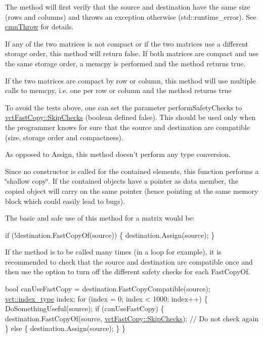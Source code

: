 \begin{DoxyItemize}
\item The method will first verify that the source and destination have the same size (rows and columns) and throws an exception otherwise ({\ttfamily std\-::runtime\-\_\-error}). See \hyperlink{cmn_throw_8h_a6fe29a0b6f112fe0032896bb904f8377}{cmn\-Throw} for details.
\item If any of the two matrices is not compact or if the two matrices use a different storage order, this method will return {\ttfamily false}. If both matrices are compact and use the same storage order, a {\ttfamily memcpy} is performed and the method returns {\ttfamily true}.
\item If the two matrices are compact by row or column, this method will use multiple calls to {\ttfamily memcpy}, i.\-e. one per row or column and the method returns {\ttfamily true}
\item To avoid the tests above, one can set the parameter {\ttfamily perform\-Safety\-Checks} to {\ttfamily \hyperlink{classvct_fast_copy_a221c1b0117c8dcf51332ad84f4e0fda5}{vct\-Fast\-Copy\-::\-Skip\-Checks}} (boolean defined {\ttfamily false}). This should be used only when the programmer knows for sure that the source and destination are compatible (size, storage order and compactness).
\item As opposed to Assign, this method doesn't perform any type conversion.
\item Since no constructor is called for the contained elements, this function performs a \char`\"{}shallow copy\char`\"{}. If the contained objects have a pointer as data member, the copied object will carry on the same pointer (hence pointing at the same memory block which could easily lead to bugs).
\end{DoxyItemize}

The basic and safe use of this method for a matrix would be\-: 
\begin{DoxyCode}
\textcolor{keywordflow}{if} (!destination.FastCopyOf(source)) \{
    destination.Assign(source);
\}
\end{DoxyCode}


If the method is to be called many times (in a loop for example), it is recommended to check that the source and destination are compatible once and then use the option to turn off the different safety checks for each Fast\-Copy\-Of. 
\begin{DoxyCode}
\textcolor{keywordtype}{bool} canUseFastCopy = destination.FastCopyCompatible(source);
\hyperlink{namespacevct_a50405d87494dce1f22ee3930ca285ee9}{vct::index\_type} index;
\textcolor{keywordflow}{for} (index = 0; index < 1000; index++) \{
    DoSomethingUseful(source);
    \textcolor{keywordflow}{if} (canUseFastCopy) \{
        destination.FastCopyOf(source, \hyperlink{classvct_fast_copy_a221c1b0117c8dcf51332ad84f4e0fda5}{vctFastCopy::SkipChecks}); \textcolor{comment}{// Do not check
       again}
    \} \textcolor{keywordflow}{else} \{
        destination.Assign(source);
    \}
\}
\end{DoxyCode}



